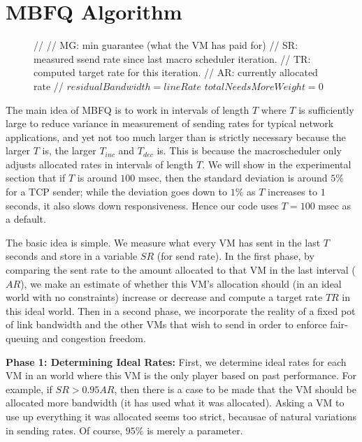 \section{MBFQ Algorithm}
\label{sec:algorithm}

\begin{figure}
\begin{algorithmic}
\State //
\State // MG: min guarantee (what the VM has paid for)
\State // SR: measured ssend rate since last macro scheduler iteration.
\State // TR: computed target rate for this iteration.
\State // AR: currently allocated rate
\State //
\State $residualBandwidth = lineRate$
\State $totalNeedsMoreWeight = 0$
\end{algorithmic}
\caption{}
\end{figure}

The main idea of MBFQ is to work in intervals of length $T$ where $T$ is
sufficiently large to reduce variance in measurement of sending rates for
typical network applications, and yet not too much larger than is strictly
necessary because the larger $T$ is, the larger $T_{inc}$ and $T_{dec}$ is.
This is because the macroscheduler only adjusts allocated rates in intervals of
length $T$.   We will show in the experimental section that if $T$ is around
$100$ msec, then the standard deviation is around $5\%$ for a TCP sender; while
the deviation goes down to $1\%$ as $T$ increases to $1$ seconds, it also slows
down responsiveness.  Hence our code uses $T = 100$ msec as a default.

The basic idea is simple.  We measure what every VM has sent in the last $T$
seconds and store in a variable $SR$ (for send rate).  In the first phase, by
comparing the sent rate to the amount  allocated to that VM in the last interval
($AR$), we make an estimate of whether this VM's allocation should (in an ideal
world with no constraints) increase or decrease and compute a target rate $TR$
in this ideal world. Then in a second phase, we incorporate the reality of a
fixed pot of link bandwidth and the other VMs that wish to send in order to
enforce fair-queuing and congestion freedom.

{\bf Phase 1: Determining Ideal Rates:}  First, we determine ideal rates for
each VM in an world where this VM is the only player based on past performance.
For example, if $SR > 0.95 AR$, then there is a case to be made that the VM
should be allocated more bandwidth (it has used what it was allocated).  Asking
a VM to use up everything it was allocated seems too strict, becausae of natural
variations in sending rates.  Of course, $95\%$ is merely a parameter.    

